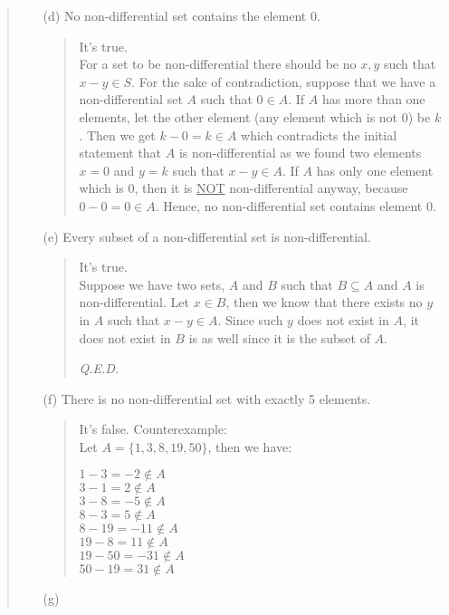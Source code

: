 \documentclass[12pt, a4paper]{article}                      %
\begin{document}
\begin{enumerate}
\begin{quote}
\begin{itemize}
\begin{quote}
\end{quote}
\item[(d)]
No non-differential set contains the element 0.
\begin{quote}
It's true.\\
For a set to be non-differential there should be no $x, y$ such that $x - y \in S$.
For the sake of contradiction, suppose that we have a non-differential set $A$ such that
$0 \in A$. If $A$ has more than one elements, let the other element (any element which is
not 0) be $k$. Then we get $k - 0 = k \in A$ which contradicts the initial statement that
$A$ is non-differential as we found two elements $x = 0$ and $y = k$ such that $x - y \in A$.
If $A$ has only one element which is $0$, then it is \underline{NOT} non-differential anyway,
because $0 - 0 = 0 \in A$. Hence, no non-differential set contains element 0.
\end{quote}
\item[(e)]
Every subset of a non-differential set is non-differential.
\begin{quote}
It's true.\\
Suppose we have two sets, $A$ and $B$ such that $B \subseteq A$ and $A$ is non-differential.
Let $x \in B$, then we know that there exists no $y$ in $A$ such that $x - y \in A$.
Since such $y$ does not exist in $A$, it does not exist in $B$ is as well since it is the subset
of $A$.
\begin{flushright}
\textit{Q.E.D.}
\end{flushright}
\end{quote}
\item[(f)]
There is no non-differential set with exactly 5 elements.
\begin{quote}
It's false. Counterexample:\\
Let $A = \{1, 3, 8, 19, 50\}$, then we have:
\begin{center}
$1 - 3 = -2 \notin A$\\
$3 - 1 = 2 \notin A$\\
$3 - 8 = -5 \notin A$\\
$8 - 3 = 5 \notin A$\\
$8 - 19 = -11 \notin A$\\
$19 - 8 = 11 \notin A$\\
$19 - 50 = -31 \notin A$\\
$50 - 19 = 31 \notin A$\\
\end{center}
\end{quote}
\item[(g)]

\end{itemize}
\end{quote}
\end{enumerate}
\end{document}
